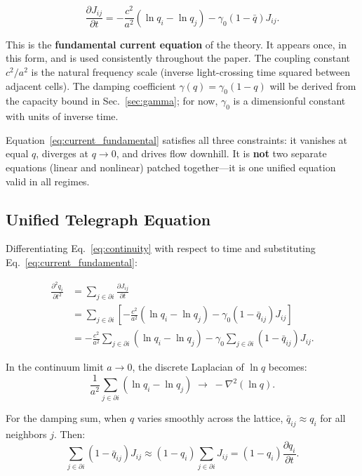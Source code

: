 \documentclass[aps,prd,twocolumn,showpacs,superscriptaddress,preprintnumbers]{revtex4-2}
\begin{document}
\begin{equation}
\boxed{\frac{\partial J_{ij}}{\partial t} = -\frac{c^2}{a^2}(\ln q_i - \ln q_j) - \gamma_0(1-\bar{q})J_{ij}}.
\label{eq:current_fundamental}
\end{equation}

This is the \textbf{fundamental current equation} of the theory.
It appears once, in this form, and is used consistently throughout the paper.
The coupling constant $c^2/a^2$ is the natural frequency scale (inverse light-crossing time squared between adjacent cells).
The damping coefficient $\gamma(q)=\gamma_0(1-q)$ will be derived from the capacity bound in Sec.~\ref{sec:gamma}; for now, $\gamma_0$ is a dimensionful constant with units of inverse time.

Equation~\eqref{eq:current_fundamental} satisfies all three constraints: it vanishes at equal $q$, diverges at $q\to0$, and drives flow downhill.
It is \textbf{not} two separate equations (linear and nonlinear) patched together---it is one unified equation valid in all regimes.

\subsection{Unified Telegraph Equation}

Differentiating Eq.~\eqref{eq:continuity} with respect to time and substituting Eq.~\eqref{eq:current_fundamental}:

\begin{align}
\frac{\partial^2 q_i}{\partial t^2} &= \sum_{j \in \partial i} \frac{\partial J_{ij}}{\partial t} \nonumber \\
&= \sum_{j \in \partial i} \left[-\frac{c^2}{a^2}(\ln q_i - \ln q_j) - \gamma_0(1-\bar{q}_{ij})J_{ij}\right] \nonumber \\
&= -\frac{c^2}{a^2} \sum_{j \in \partial i} (\ln q_i - \ln q_j) - \gamma_0 \sum_{j \in \partial i}(1-\bar{q}_{ij})J_{ij}.
\label{eq:telegraph_step}
\end{align}

In the continuum limit $a\to0$, the discrete Laplacian of $\ln q$ becomes:
\begin{equation}
\frac{1}{a^2}\sum_{j \in \partial i}(\ln q_i - \ln q_j) \;\longrightarrow\; -\nabla^2(\ln q).
\end{equation}

For the damping sum, when $q$ varies smoothly across the lattice, $\bar{q}_{ij}\approx q_i$ for all neighbors $j$.
Then:
\begin{equation}
\sum_{j \in \partial i}(1-\bar{q}_{ij})J_{ij} \approx (1-q_i)\sum_{j \in \partial i}J_{ij} = (1-q_i)\frac{\partial q_i}{\partial t}.
\end{equation}
\end{document}
